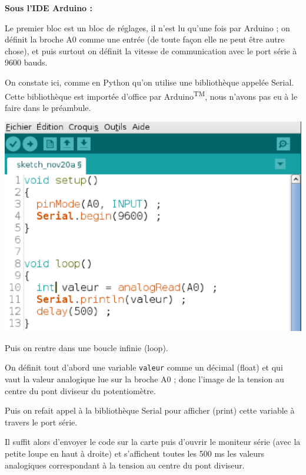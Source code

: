 \documentclass[11pt]{article}
\begin{document}
 
 \begin{multicols}{2}
\begin{center}
  \textbf{Sous l'IDE Arduino :}                                 \end{center}
  
  Le premier bloc est un bloc de réglages, il n'est lu qu'une fois par Arduino ; on définit la broche A0 comme une entrée (de toute façon elle ne peut être autre chose), et puis surtout on définit la vitesse de communication avec le port série à 9600 bauds.
  
  On constate ici, comme en Python qu'on utilise une bibliothèque appelée Serial. Cette bibliothèque est importée d'office par Arduino\textsuperscript{TM}, nous n'avons pas eu à le faire dans le préambule.
  
  
  
  \includegraphics[scale=0.45]{arduino.EPS}
  
  
  
  \medskip
  Puis on rentre dans une boucle infinie (loop). 
  
  On définit tout d'abord une variable \texttt{valeur} comme un décimal (float) et qui vaut la valeur analogique lue sur la broche A0 ; donc l'image de la tension au centre du pont diviseur du potentiomètre.
  
  \smallskip
  Puis on refait appel à la bibliothèque Serial pour afficher (print) cette variable à travers le port série.
  
  \medskip
  Il suffit alors d'envoyer le code sur la carte puis d'ouvrir le moniteur série (avec la petite loupe en haut à droite) et s'affichent toutes les 500 ms les valeurs analogiques correspondant à la tension au centre du pont diviseur.
  
 \end{multicols}
\end{document}
